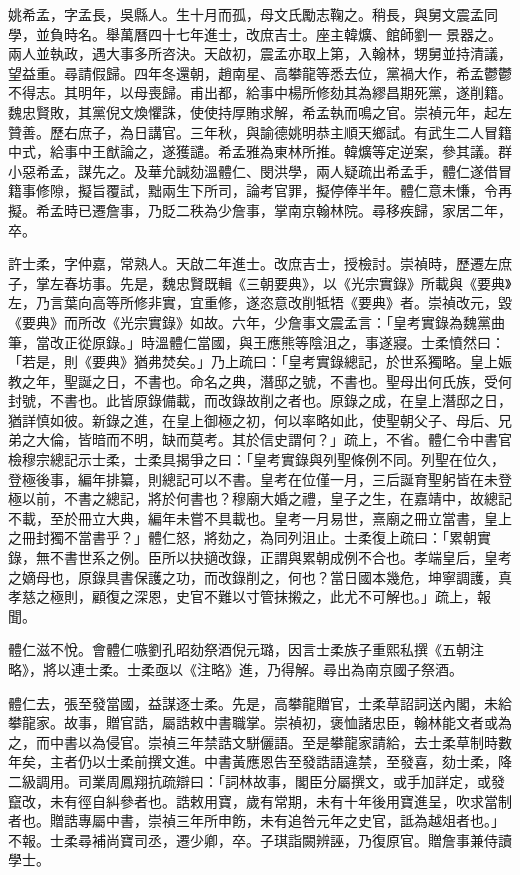 \begin{pinyinscope}
{{姚希孟，字孟長，吳縣人。生十月而孤，母文氏勵志鞠之。稍長，與舅文震孟同學，並負時名。舉萬曆四十七年進士，改庶吉士。座主韓爌、館師劉一景器之。兩人並執政，遇大事多所咨決。天啟初，震孟亦取上第，入翰林，甥舅並持清議，望益重。尋請假歸。四年冬還朝，趙南星、高攀龍等悉去位，黨禍大作，希孟鬱鬱不得志。其明年，以母喪歸。甫出都，給事中楊所修劾其為繆昌期死黨，遂削籍。魏忠賢敗，其黨倪文煥懼誅，使使持厚賄求解，希孟執而鳴之官。崇禎元年，起左贊善。歷右庶子，為日講官。三年秋，與諭德姚明恭主順天鄉試。有武生二人冒籍中式，給事中王猷論之，遂獲譴。希孟雅為東林所推。韓爌等定逆案，參其議。群小惡希孟，謀先之。及華允誠劾溫體仁、閔洪學，兩人疑疏出希孟手，體仁遂借冒籍事修隙，擬旨覆試，黜兩生下所司，論考官罪，擬停俸半年。體仁意未慊，令再擬。希孟時已遷詹事，乃貶二秩為少詹事，掌南京翰林院。尋移疾歸，家居二年，卒。

許士柔，字仲嘉，常熟人。天啟二年進士。改庶吉士，授檢討。崇禎時，歷遷左庶子，掌左春坊事。先是，魏忠賢既輯《三朝要典》，以《光宗實錄》所載與《要典》左，乃言葉向高等所修非實，宜重修，遂恣意改削牴牾《要典》者。崇禎改元，毀《要典》而所改《光宗實錄》如故。六年，少詹事文震孟言：「皇考實錄為魏黨曲筆，當改正從原錄。」時溫體仁當國，與王應熊等陰沮之，事遂寢。士柔憤然曰：「若是，則《要典》猶弗焚矣。」乃上疏曰：「皇考實錄總記，於世系獨略。皇上娠教之年，聖誕之日，不書也。命名之典，潛邸之號，不書也。聖母出何氏族，受何封號，不書也。此皆原錄備載，而改錄故削之者也。原錄之成，在皇上潛邸之日，猶詳慎如彼。新錄之進，在皇上御極之初，何以率略如此，使聖朝父子、母后、兄弟之大倫，皆暗而不明，缺而莫考。其於信史謂何？」疏上，不省。體仁令中書官檢穆宗總記示士柔，士柔具揭爭之曰：「皇考實錄與列聖條例不同。列聖在位久，登極後事，編年排纂，則總記可以不書。皇考在位僅一月，三后誕育聖躬皆在未登極以前，不書之總記，將於何書也？穆廟大婚之禮，皇子之生，在嘉靖中，故總記不載，至於冊立大典，編年未嘗不具載也。皇考一月易世，熹廟之冊立當書，皇上之冊封獨不當書乎？」體仁怒，將劾之，為同列沮止。士柔復上疏曰：「累朝實錄，無不書世系之例。臣所以抉擿改錄，正謂與累朝成例不合也。孝端皇后，皇考之嫡母也，原錄具書保護之功，而改錄削之，何也？當日國本幾危，坤寧調護，真孝慈之極則，顧復之深恩，史官不難以寸管抹摋之，此尤不可解也。」疏上，報聞。

體仁滋不悅。會體仁嗾劉孔昭劾祭酒倪元璐，因言士柔族子重熙私撰《五朝注略》，將以連士柔。士柔亟以《注略》進，乃得解。尋出為南京國子祭酒。

體仁去，張至發當國，益謀逐士柔。先是，高攀龍贈官，士柔草詔詞送內閣，未給攀龍家。故事，贈官誥，屬誥敕中書職掌。崇禎初，褒恤諸忠臣，翰林能文者或為之，而中書以為侵官。崇禎三年禁誥文駢儷語。至是攀龍家請給，去士柔草制時數年矣，主者仍以士柔前撰文進。中書黃應恩告至發誥語違禁，至發喜，劾士柔，降二級調用。司業周鳳翔抗疏辯曰：「詞林故事，閣臣分屬撰文，或手加詳定，或發竄改，未有徑自糾參者也。誥敕用寶，歲有常期，未有十年後用寶進呈，吹求當制者也。贈誥專屬中書，崇禎三年所申飭，未有追咎元年之史官，詆為越俎者也。」不報。士柔尋補尚寶司丞，遷少卿，卒。子琪詣闕辨誣，乃復原官。贈詹事兼侍讀學士。

}}
\end{pinyinscope}
